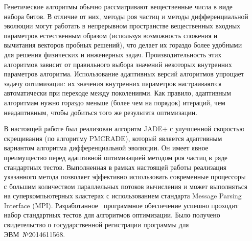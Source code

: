 Генетические алгоритмы обычно рассматривают вещественные числа в виде
набора битов.  В отличие от них, методы роя частиц и методы
дифференциальной эволюции могут работать в непрерывном пространстве
вещественных входных параметров естественным образом (используя
возможность сложения и вычитания векторов пробных решений), что делает
их гораздо более удобными для решения физических и инженерных
задач.  Производительность этих алгоритмов зависит от правильного
выбора значений некоторых внутренних параметров
алгоритма.  Использование адаптивных версий алгоритмов упрощает задачу
оптимизации: их значения внутренних параметров настраиваются
автоматически при переходе между поколениями. Как правило, адаптивным
алгоритмам нужно гораздо меньше (более чем на порядок) итераций, чем
неадаптивным, чтобы добиться того же результата оптимизации.

В настоящей работе был реализован алгоритм JADE+ с улучшенной
скоростью скрещивания (по алгоритму PMCRADE), который является
адаптивным вариантом алгоритма дифференциальной эволюции. Он имеет
явное преимущество перед адаптивной оптимизацией методом роя частиц в
ряде стандартных тестов.  Выполненная в рамках настоящей работы
реализация указанного метода позволяет эффективно использовать
современные процессоры с большим количеством параллельных потоков
вычисления и может выполняться на суперкомпьютерных кластерах с
использованием стандарта Message Parsing Interface (MPI).
Разработанное~\cite{JADE-web}  программное обеспечение успешно проходит набор
стандартных тестов для алгоритмов оптимизации.  Было получено
свидетельство о государственной регистрации программы для
ЭВМ~№2014611568. 






